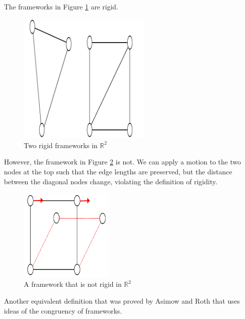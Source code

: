 \begin{example}
\label{eg: rigid graphs}    
The frameworks in Figure \ref{fig: rigid_graphs} are rigid. 

\vspace{3mm}
\begin{figure}[htbp]
    \centering
    \includegraphics[width=0.57\textwidth]{Chapter 2/7. rigid_graphs.png} 
    \caption{Two rigid frameworks in $\mathbb{R}^2$}
    \label{fig: rigid_graphs}
\end{figure}

\begin{flushleft}
However, the framework in Figure \ref{eg: not_rigid} is not. We can apply a motion to the two nodes at the top such that the edge lengths are preserved, but the distance between the diagonal nodes change, violating the definition of rigidity.    
\end{flushleft}

\begin{figure}[htbp]
    \centering
    \includegraphics[width = 0.4\textwidth]{Chapter 2/8. not_rigid.png}
    \caption{A framework that is not rigid in $\mathbb{R}^2$}
    \label{eg: not_rigid}
\end{figure}
\end{example}
\vspace{-5 mm}
\begin{flushleft}

\vspace{-3mm}
Another equivalent definition that was proved by Asimow and Roth \cite{asimow} that uses ideas of the congruency of frameworks.
\end{flushleft}

